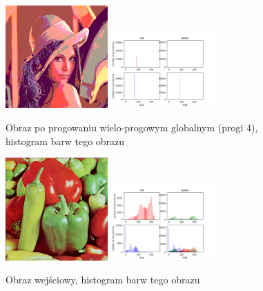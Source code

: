 \documentclass[final,a4paper,openany,12pt]{mwbk}
\begin{document}
\begin{figure}[H]
	\begin{center}
		\includegraphics[width=0.35\textwidth]{lena_color_globalMultiThreshold_result}
		\includegraphics[width=0.35\textwidth]{lena_color_globalMultiThreshold_histogram}
	\end{center}
	\caption{Obraz po progowaniu wielo-progowym globalnym (progi 4), histogram barw tego obrazu}
\end{figure}

\begin{figure}[H]
	\begin{center}
		\includegraphics[width=0.35\textwidth]{peppers_color}
		\includegraphics[width=0.35\textwidth]{peppers_color_histogram}
	\end{center}
	\caption{Obraz wejściowy, histogram barw tego obrazu}
\end{figure}
\end{document}
